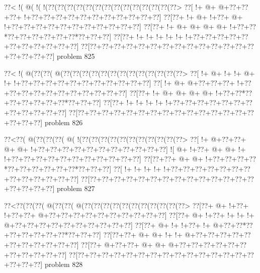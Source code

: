 \vbox{\vbox{\goo
\0??<\- !(\- @(\- !(\- !(\0??(\0??(\0??(\0??(\0??(\0??(\0??(\0??(\0??(\0??(\0??(\0??(\0??(\0??>
\0??[\- !+\- @+\- @+\0??+\0??+\0??+\- !+\0??+\0??+\0??+\0??+\0??+\0??+\0??+\0??+\0??+\0??+\0??]
\0??[\0??+\- !+\- @+\- !+\0??+\- @+\- !+\0??+\0??+\0??+\0??+\0??+\0??+\0??+\0??+\0??+\0??+\0??]
\0??[\0??+\- !+\- @+\- @+\- @+\- @+\- !+\0??+\0??*\0??+\0??+\0??+\0??+\0??+\0??*\0??+\0??+\0??]
\0??[\0??+\- !+\- !+\- !+\- !+\- !+\- !+\0??+\0??+\0??+\0??+\0??+\0??+\0??+\0??+\0??+\0??+\0??]
\0??[\0??+\0??+\0??+\0??+\0??+\0??+\0??+\0??+\0??+\0??+\0??+\0??+\0??+\0??+\0??+\0??+\0??+\0??]
}
\hfil problem 825\hfil\break
}



\vbox{\vbox{\goo
\0??<\- !(\- @(\0??(\0??(\- @(\0??(\0??(\0??(\0??(\0??(\0??(\0??(\0??(\0??(\0??(\0??(\0??(\0??>
\0??[\- !+\- @+\- !+\- !+\- @+\- !+\- !+\0??+\0??+\0??+\0??+\0??+\0??+\0??+\0??+\0??+\0??+\0??]
\0??[\- !+\- @+\- @+\0??+\0??+\0??+\- !+\0??+\0??+\0??+\0??+\0??+\0??+\0??+\0??+\0??+\0??+\0??]
\0??[\0??+\- !+\- @+\- @+\- @+\- @+\- !+\0??+\0??*\0??+\0??+\0??+\0??+\0??+\0??*\0??+\0??+\0??]
\0??[\0??+\- !+\- !+\- !+\- !+\- !+\0??+\0??+\0??+\0??+\0??+\0??+\0??+\0??+\0??+\0??+\0??+\0??]
\0??[\0??+\0??+\0??+\0??+\0??+\0??+\0??+\0??+\0??+\0??+\0??+\0??+\0??+\0??+\0??+\0??+\0??+\0??]
}
\hfil problem 826\hfil\break
}



\vbox{\vbox{\goo
\0??<\0??(\- @(\0??(\0??(\0??(\- @(\- !(\0??(\0??(\0??(\0??(\0??(\0??(\0??(\0??(\0??(\0??(\0??>
\0??[\- !+\- @+\0??+\0??+\- @+\- @+\- !+\0??+\0??+\0??+\0??+\0??+\0??+\0??+\0??+\0??+\0??+\0??]
\- ![\- @+\- !+\0??+\- @+\- @+\- !+\- !+\0??+\0??+\0??+\0??+\0??+\0??+\0??+\0??+\0??+\0??+\0??]
\0??[\0??+\0??+\- @+\- @+\- !+\0??+\0??+\0??+\0??*\0??+\0??+\0??+\0??+\0??+\0??*\0??+\0??+\0??]
\0??[\- !+\- !+\- !+\- !+\- !+\0??+\0??+\0??+\0??+\0??+\0??+\0??+\0??+\0??+\0??+\0??+\0??+\0??]
\0??[\0??+\0??+\0??+\0??+\0??+\0??+\0??+\0??+\0??+\0??+\0??+\0??+\0??+\0??+\0??+\0??+\0??+\0??]
}
\hfil problem 827\hfil\break
}



\vbox{\vbox{\goo
\0??<\0??(\0??(\0??(\- @(\0??(\0??(\- @(\0??(\0??(\0??(\0??(\0??(\0??(\0??(\0??(\0??(\0??(\0??>
\0??[\0??+\- @+\- !+\0??+\- !+\0??+\0??+\- @+\0??+\0??+\0??+\0??+\0??+\0??+\0??+\0??+\0??+\0??]
\0??[\0??+\- @+\- !+\0??+\- !+\- !+\- !+\- @+\0??+\0??+\0??+\0??+\0??+\0??+\0??+\0??+\0??+\0??]
\0??[\0??+\- @+\- !+\- !+\0??+\- !+\- @+\0??+\0??*\0??+\0??+\0??+\0??+\0??+\0??*\0??+\0??+\0??]
\0??[\0??+\0??+\- @+\- @+\- !+\- !+\- @+\0??+\0??+\0??+\0??+\0??+\0??+\0??+\0??+\0??+\0??+\0??]
\0??[\0??+\- @+\0??+\0??+\- @+\- @+\- @+\0??+\0??+\0??+\0??+\0??+\0??+\0??+\0??+\0??+\0??+\0??]
\0??[\0??+\0??+\0??+\0??+\0??+\0??+\0??+\0??+\0??+\0??+\0??+\0??+\0??+\0??+\0??+\0??+\0??+\0??]
}
\hfil problem 828\hfil\break
}



